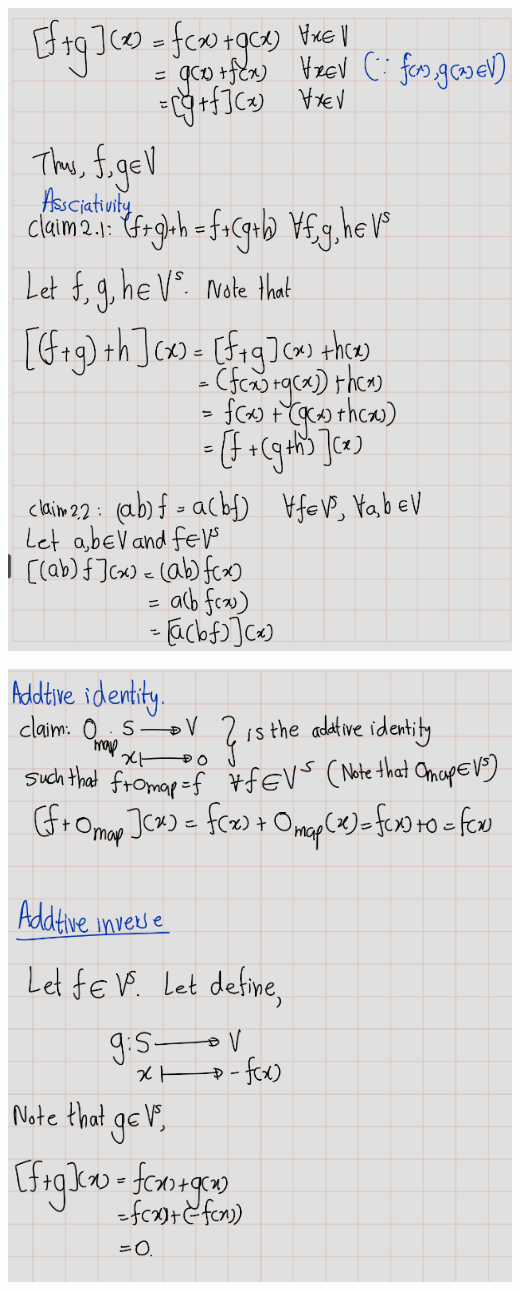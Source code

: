 \documentclass[
]{book}
\theoremstyle{definition}
\theoremstyle{definition}
\theoremstyle{definition}
\theoremstyle{definition}
\theoremstyle{remark}
\begin{document}
\includegraphics[width=8.79in]{fig/Ex1B/Ex7-2}

\includegraphics[width=8.42in]{fig/Ex1B/Ex7-3}
\end{document}

